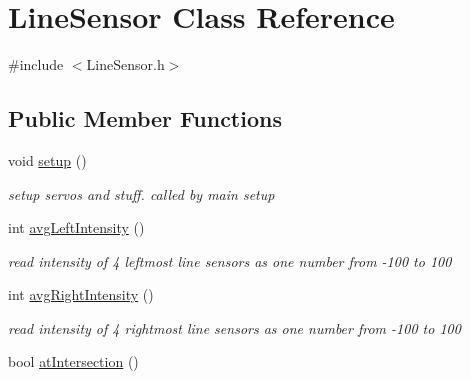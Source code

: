 \hypertarget{classLineSensor}{\section{Line\-Sensor Class Reference}
\label{classLineSensor}
}


{\ttfamily \#include $<$Line\-Sensor.\-h$>$}

\subsection*{Public Member Functions}
\begin{DoxyCompactItemize}
\item 
\hypertarget{classLineSensor_a555f6f7222ea1e76ed810edbde44c39c}{void \hyperlink{classLineSensor_a555f6f7222ea1e76ed810edbde44c39c}{setup} ()}\label{classLineSensor_a555f6f7222ea1e76ed810edbde44c39c}

\begin{DoxyCompactList}\small\item\em setup servos and stuff. called by main setup \end{DoxyCompactList}\item 
\hypertarget{classLineSensor_abe8fcbedd962cd4c460390d1228db21e}{int \hyperlink{classLineSensor_abe8fcbedd962cd4c460390d1228db21e}{avg\-Left\-Intensity} ()}\label{classLineSensor_abe8fcbedd962cd4c460390d1228db21e}

\begin{DoxyCompactList}\small\item\em read intensity of 4 leftmost line sensors as one number from -\/100 to 100 \end{DoxyCompactList}\item 
\hypertarget{classLineSensor_a20884176333b1c90cee0dbf892b8d049}{int \hyperlink{classLineSensor_a20884176333b1c90cee0dbf892b8d049}{avg\-Right\-Intensity} ()}\label{classLineSensor_a20884176333b1c90cee0dbf892b8d049}

\begin{DoxyCompactList}\small\item\em read intensity of 4 rightmost line sensors as one number from -\/100 to 100 \end{DoxyCompactList}\item 
\hypertarget{classLineSensor_a6769cf781edb7ac4a43086cd62be01e2}{bool \hyperlink{classLineSensor_a6769cf781edb7ac4a43086cd62be01e2}{at\-Intersection} ()}\label{classLineSensor_a6769cf781edb7ac4a43086cd62be01e2}


\end{DoxyCompactItemize}
